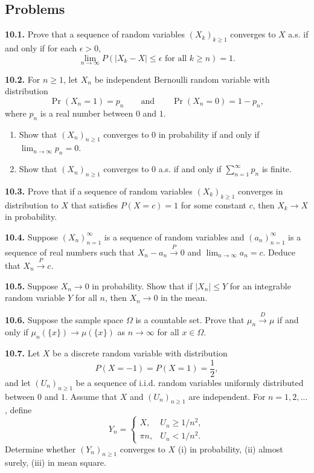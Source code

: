 \subsection*{Problems}

\textbf{10.1.} Prove that a sequence of random variables $(X_k)_{k\geq 1}$ converges to $X$ a.s. if and only if for each $\epsilon>0$,
\[
\lim_{n\to\infty}P(\lvert X_k-X\rvert\leq \epsilon\text{ for all }k\geq n)=1.
\]

\textbf{10.2.} For $n\geq 1$, let $X_n$ be independent Bernoulli random variable with distribution
\[
\operatorname{Pr}(X_n=1)=p_n
\qquad\text{and}\qquad
\operatorname{Pr}(X_n=0)=1-p_n,
\]
where $p_n$ is a real number between $0$ and $1$.
\begin{enumerate}
\item Show that $(X_n)_{n\geq 1}$ converges to $0$ in probability if and only if $\lim_{n\to\infty}p_n=0$.
\item Show that $(X_n)_{n\geq 1}$ converges to $0$ a.s. if and only if $\sum_{n=1}^{\infty}p_n$ is finite.
\end{enumerate}

\textbf{10.3.} Prove that if a sequence of random variables $(X_k)_{k\geq 1}$ converges in distribution to $X$ that satisfies $P(X=c)=1$ for some constant $c$, then $X_k\to X$ in probability.

\textbf{10.4.} Suppose $(X_n)_{n=1}^{\infty}$ is a sequence of random variables and $(a_n)_{n=1}^{\infty}$ is a sequence of real numbers such that $X_n-a_n\xrightarrow{P}0$ and $\lim_{n\to\infty}a_n=c$. Deduce that $X_n\xrightarrow{P}c$.

\textbf{10.5.} Suppose $X_n\to 0$ in probability. Show that if $\lvert X_n\rvert\leq Y$ for an integrable random variable $Y$ for all $n$, then $X_n\to 0$ in the mean.

\textbf{10.6.} Suppose the sample space $\Omega$ is a countable set. Prove that $\mu_n\xrightarrow{D}\mu$ if and only if $\mu_n(\{x\})\to\mu(\{x\})$ as $n\to\infty$ for all $x\in\Omega$.

\textbf{10.7.} Let $X$ be a discrete random variable with distribution
\[
P(X=-1)=P(X=1)=\frac{1}{2},
\]
and let $(U_n)_{n\geq 1}$ be a sequence of i.i.d. random variables uniformly distributed between $0$ and $1$. Assume that $X$ and $(U_n)_{n\geq 1}$ are independent. For $n=1,2,\ldots$, define
\[
Y_n=
\begin{cases}
X, & U_n\geq 1/n^2,\\
\pi n, & U_n<1/n^2.
\end{cases}
\]
Determine whether $(Y_n)_{n\geq 1}$ converges to $X$ (i) in probability, (ii) almost surely, (iii) in mean square.


